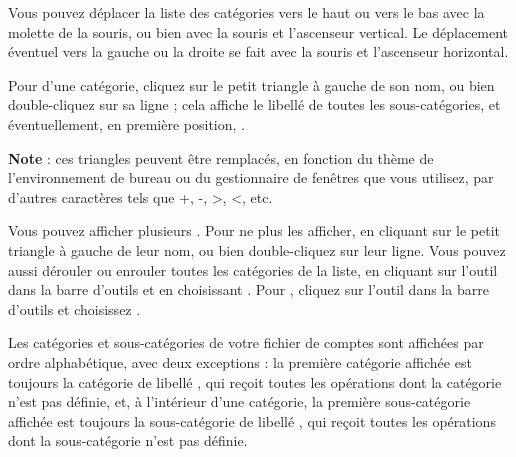 Vous pouvez déplacer la liste des catégories vers le haut ou vers le bas avec la molette de la souris, ou bien avec la souris et l'ascenseur vertical. Le déplacement éventuel vers la gauche ou la droite se fait avec la souris et l'ascenseur horizontal.

Pour   d'une catégorie, cliquez sur le petit triangle à gauche de son nom, ou bien double-cliquez sur sa ligne ;
 cela affiche le libellé  de toutes les sous-catégories, et éventuellement, en première position, .

\textbf{Note} : ces triangles peuvent être remplacés, en fonction du thème de l'environnement de bureau ou du gestionnaire de fenêtres que vous utilisez, par d'autres caractères tels que +, -, >, <, etc. 


Vous pouvez afficher plusieurs . Pour ne plus les afficher,  en cliquant sur le petit triangle à gauche de leur nom, ou bien double-cliquez sur leur ligne. Vous pouvez aussi dérouler ou enrouler toutes les catégories de la liste, en cliquant sur l'outil  dans la barre d'outils et en choisissant . Pour , cliquez sur l'outil  dans la barre d'outils et choisissez .

Les catégories et sous-catégories de votre fichier de comptes sont affichées par ordre alphabétique, avec deux exceptions : la première catégorie affichée est toujours la catégorie de libellé , qui reçoit toutes les opérations dont la catégorie n'est pas définie, et, à l'intérieur d'une catégorie, la première sous-catégorie affichée est toujours la sous-catégorie de libellé , qui reçoit toutes les opérations dont la sous-catégorie n'est pas définie.

